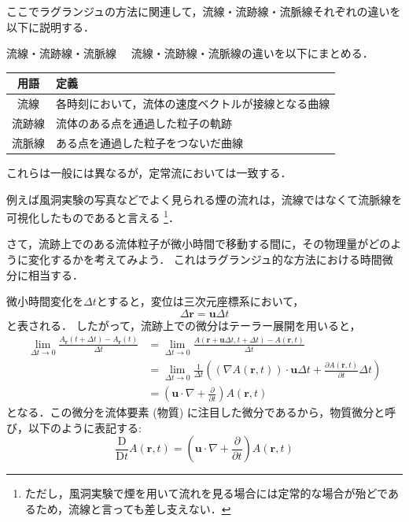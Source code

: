 \documentclass[uplatex,dvipdfmx,a4j,11pt]{jsreport}
\newcommand{\Diff}{\mathrm{D}} %
\numberwithin{equation}{chapter}
\begin{document}
ここでラグランジュの方法に関連して，流線・流跡線・流脈線それぞれの違いを以下に説明する．
\begin{definition}{流線・流跡線・流脈線}{}{}
  　流線・流跡線・流脈線の違いを以下にまとめる．
  \begin{center}
  \begin{tabular}{cl}
    \hline
    用語 & 定義 \\
    \hline
    流線 & 各時刻において，流体の速度ベクトルが接線となる曲線 \\
    流跡線 & 流体のある点を通過した粒子の軌跡 \\
    流脈線 & ある点を通過した粒子をつないだ曲線 \\
    \hline
  \end{tabular}
  \end{center}
  これらは一般には異なるが，定常流においては一致する．
\end{definition}
例えば風洞実験の写真などでよく見られる煙の流れは，流線ではなくて流脈線を可視化したものであると言える
\footnote{ただし，風洞実験で煙を用いて流れを見る場合には定常的な場合が殆どであるため，流線と言っても差し支えない．}．

\enskip

さて，流跡上でのある流体粒子が微小時間で移動する間に，その物理量がどのように変化するかを考えてみよう．
これはラグランジュ的な方法における時間微分に相当する．

微小時間変化を$\Delta t$とすると，変位は三次元座標系において，
\begin{equation*}
  \Delta \mathbf{r} = \mathbf{u} \Delta t
\end{equation*}
と表される．
したがって，流跡上での微分はテーラー展開を用いると，
\begin{align*}
  \lim_{\Delta t \to 0} \frac{A_\mathbf{r}(t + \Delta t) - A_\mathbf{r}(t)}{\Delta t}
  &= \lim_{\Delta t \to 0} \frac{A(\mathbf{r} + \mathbf{u} \Delta t, t + \Delta t) - A(\mathbf{r}, t)}{\Delta t}\\
  &= \lim_{\Delta t \to 0} \frac{1}{\Delta t}\left((\nabla A(\mathbf{r}, t))\cdot \mathbf{u}\Delta t  + \frac{\partial A(\mathbf{r}, t)}{\partial t}\Delta t\right)\\
  &= \left(\mathbf{u}\cdot \nabla + \frac{\partial }{\partial t}\right) A(\mathbf{r}, t)
\end{align*}
となる．この微分を流体要素 (物質) に注目した微分であるから，物質微分と呼び，以下のように表記する:
\begin{equation*}
  \frac{\Diff}{\Diff t} A(\mathbf{r}, t) = \left(\mathbf{u}\cdot \nabla + \frac{\partial }{\partial t}\right) A(\mathbf{r}, t)
\end{equation*}
\end{document}
